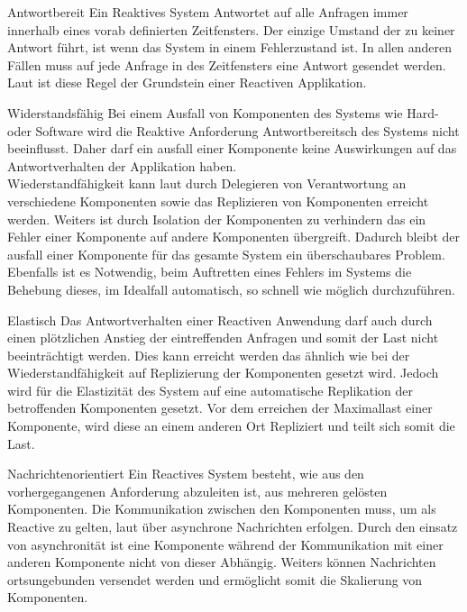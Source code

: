 \begin{description}
    \item{Antwortbereit}\label{reactivo:responsive}
    Ein Reaktives System Antwortet auf alle Anfragen immer innerhalb eines vorab definierten Zeitfensters. Der einzige Umstand der zu keiner Antwort führt, ist wenn das System in einem Fehlerzustand ist. In allen anderen Fällen muss auf jede Anfrage in des Zeitfensters eine Antwort gesendet werden.\\
    Laut \cite{reactiveManifesto} ist diese Regel der Grundstein einer {Reactiven} Applikation.
    \item{Widerstandsfähig}\label{reactivo:resilient}
    Bei einem Ausfall von Komponenten des Systems wie Hard- oder Software wird die Reaktive Anforderung {Antwortbereitsch} des Systems nicht beeinflusst. Daher darf ein ausfall einer Komponente keine Auswirkungen auf das Antwortverhalten der Applikation haben.\\
    Wiederstandfähigkeit kann laut \cite{reactiveManifesto} durch Delegieren von Verantwortung an verschiedene Komponenten sowie das Replizieren von Komponenten erreicht werden. Weiters ist durch Isolation der Komponenten zu verhindern das ein Fehler einer Komponente auf andere Komponenten übergreift. Dadurch bleibt der ausfall einer Komponente für das gesamte System ein überschaubares Problem. Ebenfalls ist es Notwendig, beim Auftretten eines Fehlers im Systems die Behebung dieses, im Idealfall automatisch, so schnell wie möglich durchzuführen.
    \item{Elastisch}\label{reactivo:elastic}
    Das Antwortverhalten einer Reactiven Anwendung darf auch durch einen plötzlichen Anstieg der eintreffenden Anfragen und somit der Last nicht beeinträchtigt werden. Dies kann erreicht werden das ähnlich wie bei der Wiederstandfähigkeit auf Replizierung der Komponenten gesetzt wird. Jedoch wird für die Elastizität des System auf eine automatische Replikation der betroffenden Komponenten gesetzt. Vor dem erreichen der Maximallast einer Komponente, wird diese an einem anderen Ort Repliziert und teilt sich somit die Last. 
    \item{Nachrichtenorientiert}\label{reactivo:messageDriven}
    Ein Reactives System besteht, wie aus den vorhergegangenen Anforderung abzuleiten ist, aus mehreren gelösten Komponenten. Die Kommunikation zwischen den Komponenten muss, um als Reactive zu gelten, laut \cite{reactiveManifesto}  über asynchrone Nachrichten erfolgen. Durch den einsatz von asynchronität ist eine Komponente während der Kommunikation mit einer anderen Komponente nicht von dieser Abhängig. Weiters können Nachrichten ortsungebunden versendet werden und ermöglicht somit die Skalierung von Komponenten. 
\end{description} 